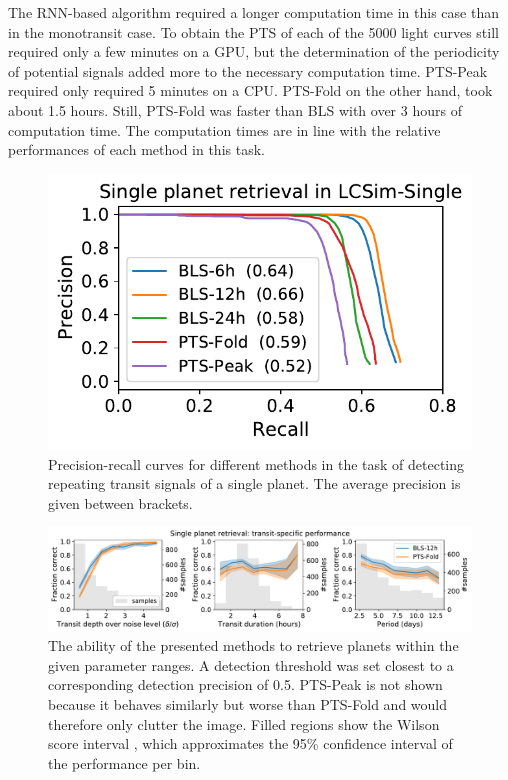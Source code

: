 The RNN-based algorithm required a longer computation time in this case than in the monotransit case. To obtain the PTS of each of the 5000 light curves still required only a few minutes on a GPU, but the determination of the periodicity of potential signals added more to the necessary computation time. PTS-Peak required only required 5 minutes on a CPU. PTS-Fold on the other hand, took about 1.5 hours. Still, PTS-Fold was faster than BLS with over 3 hours of computation time. The computation times are in line with the relative performances of each method in this task. 


\begin{figure}
    \centering
    \includegraphics[width=0.35\linewidth]{Experiments/Figures/Singles/single_pr.pdf}
    \caption{Precision-recall curves for different methods in the task of detecting repeating transit signals of a single planet. The average precision is given between brackets.}
    \label{fig:single_pr}
\end{figure}


\begin{figure}
    \centering
    \includegraphics[width=\linewidth]{Experiments/Figures/Singles/single_transit_specific.pdf}
    \caption{The ability of the presented methods to retrieve planets within the given parameter ranges. A detection threshold was set closest to a corresponding detection precision of 0.5. PTS-Peak is not shown because it behaves similarly but worse than PTS-Fold and would therefore only clutter the image. Filled regions show the Wilson score interval \citep{wilson1927probable}, which approximates the 95\% confidence interval of the performance per bin.}
    \label{fig:single_transit}
\end{figure}



